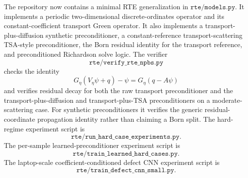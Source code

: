 \documentclass[11pt]{article}
\begin{document}
The repository now contains a minimal RTE generalization in
\(\texttt{rte/models.py}\). It implements a periodic two-dimensional
discrete-ordinates operator and its constant-coefficient transport Green
operator. It also implements a
transport-plus-diffusion synthetic preconditioner, a constant-reference
transport-scattering TSA-style preconditioner, the Born residual identity for
the transport reference, and preconditioned Richardson solve logic. The verifier
\[
  \texttt{rte/verify\_rte\_npbs.py}
\]
checks the identity
\[
  G_\eta(V_\eta\psi+q)-\psi
  =
  G_\eta(q-A\psi)
\]
and verifies residual decay for both the raw transport preconditioner and the
transport-plus-diffusion and transport-plus-TSA preconditioners on a
moderate-scattering case. For synthetic preconditioners it verifies the generic
residual-coordinate propagation identity rather than claiming a Born split.
The hard-regime experiment script is
\[
  \texttt{rte/run\_hard\_case\_experiments.py}.
\]
The per-sample learned-preconditioner experiment script is
\[
  \texttt{rte/train\_learned\_hard\_cases.py}.
\]
The laptop-scale coefficient-conditioned defect CNN experiment script is
\[
  \texttt{rte/train\_defect\_cnn\_small.py}.
\]
\end{document}
